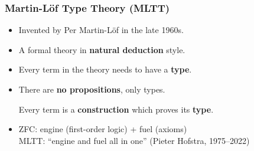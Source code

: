 \documentclass[handout]{beamer} %
\begin{document}
\begin{frame}
  \frametitle{Martin-L\"of Type Theory (MLTT)}

  \begin{itemize}
    \item Invented by Per Martin-L\"of in the late 1960s.
    \item A formal theory in \textbf{natural deduction} style.
    \item Every term in the theory needs to have a \textbf{type}.
    \item There are \textbf{no propositions}, only types.

    Every term is a \textbf{construction} which proves its \textbf{type}.

    \begin{center}
    \end{center}
    \item ZFC: engine (first-order logic) + fuel (axioms) \\
    MLTT: ``engine and fuel all in one'' (Pieter Hofstra, 1975--2022) 
  \end{itemize}
  
\end{frame}
\end{document}
